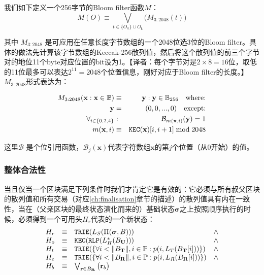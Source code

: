 \documentclass[UTF8,nofonts]{ctexart}
\begin{document}
\begin{multicols}{2}
我们如下定义一个256字节的Bloom filter函数$M$：
\begin{equation}
M(O) \equiv \bigvee_{t \in \{O_a\} \cup O_\mathbf{t}} \big( M_{3:2048}(t) \big)
\end{equation}

其中 $M_{3:2048}$ 是可应用在任意长度字节数组的一个2048位选3位的Bloom filter。具体的做法先计算该字节数组的Keccak-256散列值，然后将这个散列值的前三个字节对的地位11个byte对应位置的bit设为1。【译者：每个字节对是$2\times 8 = 16$位，取低的11位最多可以表达$2^{11} = 2048$个位置信息，刚好对应于Bloom filter的长度。】  $M_{3:2048}$形式表达为：

\begin{eqnarray}
M_{3:2048}(\mathbf{x}: \mathbf{x} \in \mathbb{B}) & \equiv & \mathbf{y}: \mathbf{y} \in \mathbb{B}_{256} \quad \text{where:}\\
\mathbf{y} & = & (0, 0, ..., 0) \quad \text{except:}\\
\forall_{i \in \{0, 2, 4\}}&:& \mathcal{B}_{m(\mathbf{x}, i)}(\mathbf{y}) = 1\\
m(\mathbf{x}, i) &\equiv& \mathtt{\tiny KEC}(\mathbf{x})[i, i + 1] \bmod 2048
\end{eqnarray}

这里$\mathcal{B}$ 是个位引用函数，$\mathcal{B}_j(\mathbf{x})$代表字符数组$\mathbf{x}$的第$j$个位置（从0开始）的值。

\subsubsection{整体合法性}

当且仅当一个区块满足下列条件时我们才肯定它是有效的：它必须与所有叔父区块的散列值和所有交易（对应\ref{ch:finalisation}章节的描述）的散列值具有内在一致性，当在（父亲区块的最终状态演化而来的）基础状态$\boldsymbol{\sigma}$之上按照顺序执行的时候，必须得到一个可用头$H_r$代表的一个新状态：
\begin{equation}
\begin{array}[t]{lclc}
H_r &\equiv& \mathtt{\small TRIE}(L_S(\Pi(\boldsymbol{\sigma}, B))) & \wedge \\
H_o &\equiv& \mathtt{\small KEC}(\mathtt{\small RLP}(L_H^*(B_\mathbf{U}))) & \wedge \\
H_t &\equiv& \mathtt{\small TRIE}(\{\forall i < \lVert B_\mathbf{T} \rVert, i \in \mathbb{P}: p(i, L_T(B_\mathbf{T}[i]))\}) & \wedge \\
H_e &\equiv& \mathtt{\small TRIE}(\{\forall i < \lVert B_\mathbf{R} \rVert, i \in \mathbb{P}: p(i, L_R(B_\mathbf{R}[i]))\}) & \wedge \\
H_b &\equiv& \bigvee_{\mathbf{r} \in B_\mathbf{R}} \big( \mathbf{r}_b \big)
\end{array}
\end{equation}


\end{multicols}
\end{document}
